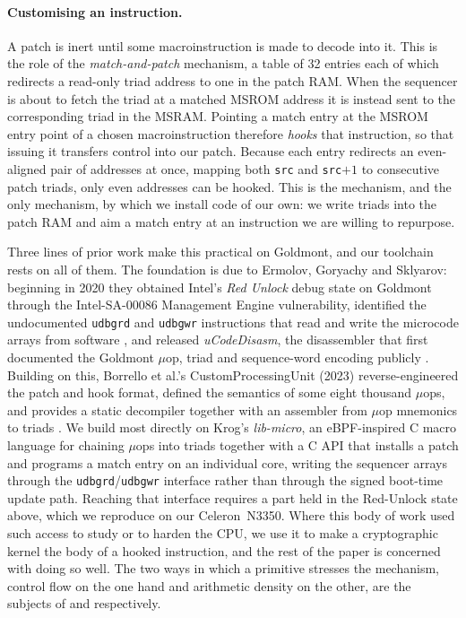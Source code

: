 \paragraph{Customising an instruction.}
A patch is inert until some macroinstruction is made to decode into it. This is
the role of the \emph{match-and-patch} mechanism, a table of 32 entries each of
which redirects a read-only triad address to one in the patch RAM. When the
sequencer is about to fetch the triad at a matched MSROM address it is instead
sent to the corresponding triad in the MSRAM. Pointing a match entry at the
MSROM entry point of a chosen macroinstruction therefore \emph{hooks} that
instruction, so that issuing it transfers control into our patch. Because each
entry redirects an even-aligned pair of addresses at once, mapping both
\texttt{src} and \texttt{src}${+}1$ to consecutive patch triads, only even
addresses can be hooked. This is the mechanism, and the only mechanism, by which
we install code of our own: we write triads into the patch RAM and aim a match
entry at an instruction we are willing to repurpose.

Three lines of prior work make this practical on Goldmont, and our toolchain
rests on all of them. The foundation is due to Ermolov, Goryachy and Sklyarov:
beginning in 2020 they obtained Intel's \emph{Red Unlock} debug state on Goldmont
through the Intel-SA-00086 Management Engine vulnerability, identified the
undocumented \texttt{udbgrd} and \texttt{udbgwr} instructions that read and write
the microcode arrays from software \cite{ermolovUndocumentedX862022}, and released
\emph{uCodeDisasm}, the disassembler that first documented the Goldmont $\mu$op,
triad and sequence-word encoding publicly \cite{ermolovUCodeDisasm2021}. Building
on this, Borrello et al.'s CustomProcessingUnit (2023) reverse-engineered the
patch and hook format, defined the semantics of some eight thousand $\mu$ops, and
provides a static decompiler together with an assembler from $\mu$op mnemonics to
triads \cite{borrelloCustomProcessingUnitReverseEngineering2023}. We build most
directly on Krog's \emph{lib-micro}, an eBPF-inspired C macro language for
chaining $\mu$ops into triads together with a C API that installs a patch and
programs a match entry on an individual core, writing the sequencer arrays
through the \texttt{udbgrd}/\texttt{udbgwr} interface rather than through the
signed boot-time update path. Reaching that interface requires a part held in the
Red-Unlock state above, which we reproduce on our \hbox{Celeron~N3350}. Where
this body of work used such access to study or to harden the CPU, we use it to
make a cryptographic kernel the body of a hooked instruction, and the rest of the
paper is concerned with doing so well. The two ways in which a primitive
stresses the mechanism, control flow on the one hand and arithmetic density on
the other, are the subjects of  and 
respectively.

